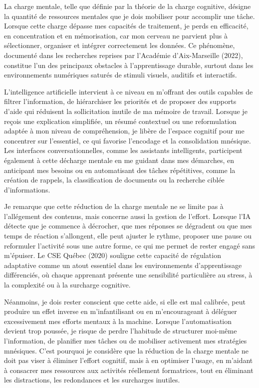 \documentclass[11pt,a4paper]{report}
\begin{document}
La charge mentale, telle que définie par la théorie de la charge cognitive, désigne la quantité de ressources mentales que je dois mobiliser pour accomplir une tâche. Lorsque cette charge dépasse mes capacités de traitement, je perds en efficacité, en concentration et en mémorisation, car mon cerveau ne parvient plus à sélectionner, organiser et intégrer correctement les données. Ce phénomène, documenté dans les recherches reprises par l’Académie d’Aix-Marseille (2022), constitue l’un des principaux obstacles à l’apprentissage durable, surtout dans les environnements numériques saturés de stimuli visuels, auditifs et interactifs.

L’intelligence artificielle intervient à ce niveau en m’offrant des outils capables de filtrer l’information, de hiérarchiser les priorités et de proposer des supports d’aide qui réduisent la sollicitation inutile de ma mémoire de travail. Lorsque je reçois une explication simplifiée, un résumé contextuel ou une reformulation adaptée à mon niveau de compréhension, je libère de l’espace cognitif pour me concentrer sur l’essentiel, ce qui favorise l’encodage et la consolidation mnésique. Les interfaces conversationnelles, comme les assistants intelligents, participent également à cette décharge mentale en me guidant dans mes démarches, en anticipant mes besoins ou en automatisant des tâches répétitives, comme la création de rappels, la classification de documents ou la recherche ciblée d’informations.

Je remarque que cette réduction de la charge mentale ne se limite pas à l’allégement des contenus, mais concerne aussi la gestion de l’effort. Lorsque l’IA détecte que je commence à décrocher, que mes réponses se dégradent ou que mes temps de réaction s’allongent, elle peut ajuster le rythme, proposer une pause ou reformuler l’activité sous une autre forme, ce qui me permet de rester engagé sans m’épuiser. Le CSE Québec (2020) souligne cette capacité de régulation adaptative comme un atout essentiel dans les environnements d’apprentissage différenciés, où chaque apprenant présente une sensibilité particulière au stress, à la complexité ou à la surcharge cognitive.

Néanmoins, je dois rester conscient que cette aide, si elle est mal calibrée, peut produire un effet inverse en m’infantilisant ou en m’encourageant à déléguer excessivement mes efforts mentaux à la machine. Lorsque l’automatisation devient trop poussée, je risque de perdre l’habitude de structurer moi-même l’information, de planifier mes tâches ou de mobiliser activement mes stratégies mnésiques. C’est pourquoi je considère que la réduction de la charge mentale ne doit pas viser à éliminer l’effort cognitif, mais à en optimiser l’usage, en m’aidant à consacrer mes ressources aux activités réellement formatrices, tout en éliminant les distractions, les redondances et les surcharges inutiles.
\end{document}

